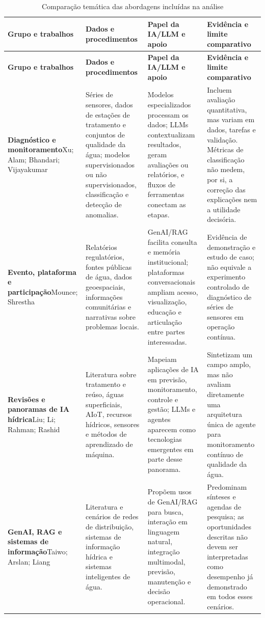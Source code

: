 \small
\setlength{\tabcolsep}{3pt}
\renewcommand{\arraystretch}{1.15}
\begin{longtable}{p{2.6cm}p{3.5cm}p{4.0cm}p{4.1cm}}
\caption{Comparação temática das abordagens incluídas na análise}\label{tab:ea-comparacao}\\
\hline
\textbf{Grupo e trabalhos} & \textbf{Dados e procedimentos} & \textbf{Papel da IA/LLM e apoio} & \textbf{Evidência e limite comparativo} \\
\hline
\endfirsthead
\hline
\textbf{Grupo e trabalhos} & \textbf{Dados e procedimentos} & \textbf{Papel da IA/LLM e apoio} & \textbf{Evidência e limite comparativo} \\
\hline
\endhead
\textbf{Diagnóstico e monitoramento}\newline Xu; Alam; Bhandari; Vijayakumar & Séries de sensores, dados de estações de tratamento e conjuntos de qualidade da água; modelos supervisionados ou não supervisionados, classificação e detecção de anomalias. & Modelos especializados processam os dados; LLMs contextualizam resultados, geram avaliações ou relatórios, e fluxos de ferramentas conectam as etapas. & Incluem avaliação quantitativa, mas variam em dados, tarefas e validação. Métricas de classificação não medem, por si, a correção das explicações nem a utilidade decisória. \\
\hline
\textbf{Evento, plataforma e participação}\newline Mounce; Shrestha & Relatórios regulatórios, fontes públicas de água, dados geoespaciais, informações comunitárias e narrativas sobre problemas locais. & GenAI/RAG facilita consulta e memória institucional; plataformas conversacionais ampliam acesso, visualização, educação e articulação entre partes interessadas. & Evidência de demonstração e estudo de caso; não equivale a experimento controlado de diagnóstico de séries de sensores em operação contínua. \\
\hline
\textbf{Revisões e panoramas de IA hídrica}\newline Liu; Li; Rahman; Rashid & Literatura sobre tratamento e reúso, águas superficiais, AIoT, recursos hídricos, sensores e métodos de aprendizado de máquina. & Mapeiam aplicações de IA em previsão, monitoramento, controle e gestão; LLMs e agentes aparecem como tecnologias emergentes em parte desse panorama. & Sintetizam um campo amplo, mas não avaliam diretamente uma arquitetura única de agente para monitoramento contínuo de qualidade da água. \\
\hline
\textbf{GenAI, RAG e sistemas de informação}\newline Taiwo; Arslan; Liang & Literatura e cenários de redes de distribuição, sistemas de informação hídrica e sistemas inteligentes de água. & Propõem usos de GenAI/RAG para busca, interação em linguagem natural, integração multimodal, previsão, manutenção e decisão operacional. & Predominam sínteses e agendas de pesquisa; as oportunidades descritas não devem ser interpretadas como desempenho já demonstrado em todos esses cenários. \\

\end{longtable}
